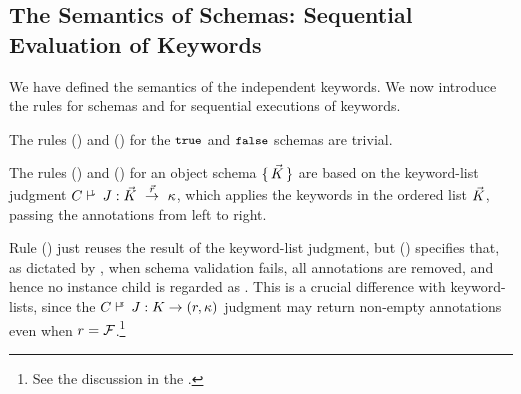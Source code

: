 \subsection{The Semantics of Schemas: Sequential Evaluation of Keywords}\label{sec:sequential}


We have defined the semantics of the independent keywords.
We now introduce the rules for schemas and for sequential executions of keywords.

The rules (\rtrueS) and (\rfalseS) for the $\mbox{\tt{\small true}}$ and $\mbox{\tt{\small false}}$ schemas are trivial.

%

The rules ({\rschema{}}) and ({\rschema{}}) 
for an object schema $\{\,{\vec{K}}\,\}$ are based on the keyword-list 
judgment $\KLJudgCJ{\Kl}\RetL{\rl}{\pkl}$, which
applies the keywords in the ordered list $\vec{K}$, passing the annotations from left to right. 

Rule ({\rschema{}}) just reuses the result of the keyword-list 
judgment, but ({\rschema{}}) specifies that, as dictated by \citep{specs2020}, when schema validation
fails, all annotations are removed, and hence no instance child is regarded as {\evaluated}.
This is a crucial difference with keyword-lists, since the $\KJudgCJ{K}\Ret{}{(r,\pk)} $
judgment may return non-empty annotations even when $r=\mathcal{F}$.\footnote{See the discussion in the {\FV}.}




